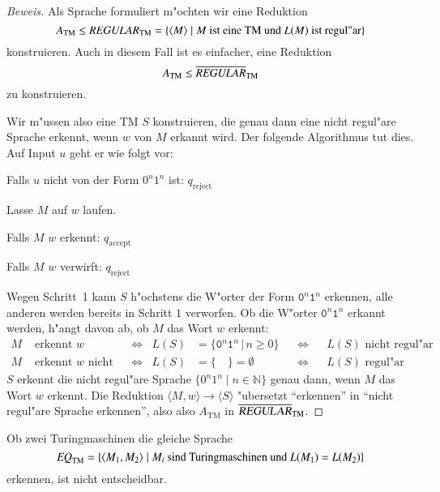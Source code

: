 \begin{proof}[Beweis]
Als Sprache formuliert m"ochten wir eine Reduktion 
\[
A_{\text{TM}}\le\text{\it REGULAR}_{\text{TM}}=\{
\langle M\rangle\;|\;\text{$M$ ist eine TM und $L(M)$ ist regul"ar}
\}
\]
%
konstruieren.
Auch in diesem Fall ist es einfacher, eine
Reduktion
\[
A_{\text{TM}}\le\overline{\text{\it REGULAR}}_{\text{TM}}
\]
zu konstruieren.

Wir m"ussen also eine TM $S$ konstruieren, die genau
dann eine nicht regul"are Sprache erkennt, wenn $w$ von $M$ erkannt wird.
Der folgende Algorithmus tut dies.
Auf Input $u$ geht er wie folgt
vor:
\medskip
\begin{compactenum}
\item Falls $u$ nicht von der Form $0^n1^n$ ist: $q_{\text{reject}}$
\item Lasse $M$ auf $w$ laufen.
\item Falls $M$ $w$ erkennt: $q_{\text{accept}}$
\item Falls $M$ $w$ verwirft: $q_{\text{reject}}$
\end{compactenum}
\medskip
Wegen Schritt~1 kann $S$ h"ochstens die W"orter der Form
$\texttt{0}^n\texttt{1}^n$ erkennen, alle anderen werden bereits in
Schritt $1$ verworfen.
Ob die W"orter 
$\texttt{0}^n\texttt{1}^n$ erkannt werden, h"angt davon ab, ob $M$ das Wort
$w$ erkennt:
\begin{align*}
   M&\text{ erkennt $w$}      &
    &\Leftrightarrow&
L(S)&=\{\texttt{0}^n\texttt{1}^n\,|\, n\ge 0\}&
    &\Leftrightarrow&
    &\text{$L(S)$ nicht regul"ar}\\
   M&\text{ erkennt $w$ nicht}&
    &\Leftrightarrow&
L(S)&=\{\quad\}=\emptyset&
    &\Leftrightarrow&
    &\text{$L(S)$ regul"ar}
\end{align*}
$S$ erkennt die nicht regul"are Sprache $\{0^n1^n\;|\;n\in\mathbb N\}$
genau dann, wenn $M$ das Wort $w$ erkennt.
Die Reduktion $\langle M,w\rangle\to \langle S\rangle$ "ubersetzt
``erkennen'' in ``nicht regul"are Sprache erkennen'', also also $A_{\text{TM}}$
in $\overline{\textsl{REGULAR}}_{\text{TM}}$.
\end{proof}

%
\begin{satz}
Ob zwei Turingmaschinen die gleiche Sprache
\[
\text{\it EQ}_{\text{TM}}=\{
\langle M_1,M_2\rangle\;|\;\text{$M_i$ sind Turingmaschinen und $L(M_1)=L(M_2)$}
\}
\]
%
erkennen, ist nicht entscheidbar.
\end{satz}


